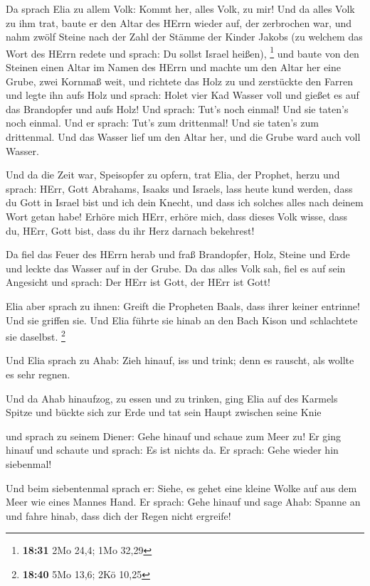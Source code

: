  Da sprach Elia zu allem Volk: Kommt her, alles Volk, zu
mir! Und da alles Volk zu ihm trat, baute er den Altar des HErrn wieder
auf, der zerbrochen war,  und nahm zwölf Steine nach der
Zahl der Stämme der Kinder Jakobs (zu welchem das Wort des HErrn redete
und sprach: Du sollst Israel heißen), \footnote{\textbf{18:31} 2Mo 24,4;
  1Mo 32,29}  und baute von den Steinen einen Altar im
Namen des HErrn und machte um den Altar her eine Grube, zwei Kornmaß
weit,  und richtete das Holz zu und zerstückte den Farren
und legte ihn aufs Holz  und sprach: Holet vier Kad Wasser
voll und gießet es auf das Brandopfer und aufs Holz! Und sprach: Tut's
noch einmal! Und sie taten's noch einmal. Und er sprach: Tut's zum
drittenmal! Und sie taten's zum drittenmal.  Und das Wasser
lief um den Altar her, und die Grube ward auch voll Wasser.

 Und da die Zeit war, Speisopfer zu opfern, trat Elia, der
Prophet, herzu und sprach: HErr, Gott Abrahams, Isaaks und Israels, lass
heute kund werden, dass du Gott in Israel bist und ich dein Knecht, und
dass ich solches alles nach deinem Wort getan habe!  Erhöre
mich HErr, erhöre mich, dass dieses Volk wisse, dass du, HErr, Gott
bist, dass du ihr Herz darnach bekehrest!

 Da fiel das Feuer des HErrn herab und fraß Brandopfer,
Holz, Steine und Erde und leckte das Wasser auf in der Grube.
 Da das alles Volk sah, fiel es auf sein Angesicht und
sprach: Der HErr ist Gott, der HErr ist Gott!

 Elia aber sprach zu ihnen: Greift die Propheten Baals,
dass ihrer keiner entrinne! Und sie griffen sie. Und Elia führte sie
hinab an den Bach Kison und schlachtete sie daselbst. \footnote{\textbf{18:40}
  5Mo 13,6; 2Kö 10,25}

 Und Elia sprach zu Ahab: Zieh hinauf, iss und trink; denn
es rauscht, als wollte es sehr regnen.

 Und da Ahab hinaufzog, zu essen und zu trinken, ging Elia
auf des Karmels Spitze und bückte sich zur Erde und tat sein Haupt
zwischen seine Knie

 und sprach zu seinem Diener: Gehe hinauf und schaue zum
Meer zu! Er ging hinauf und schaute und sprach: Es ist nichts da. Er
sprach: Gehe wieder hin siebenmal!

 Und beim siebentenmal sprach er: Siehe, es gehet eine
kleine Wolke auf aus dem Meer wie eines Mannes Hand. Er sprach: Gehe
hinauf und sage Ahab: Spanne an und fahre hinab, dass dich der Regen
nicht ergreife!


